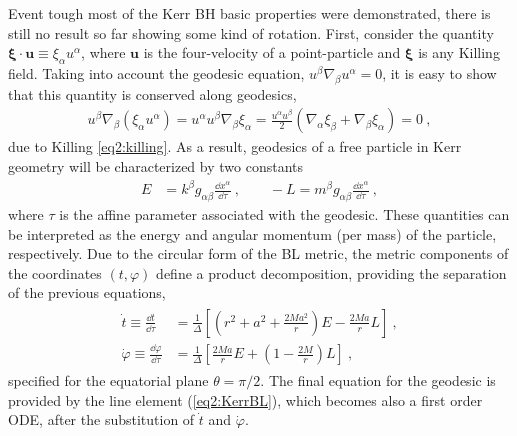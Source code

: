 Event tough most of the Kerr BH basic properties were demonstrated, there is still no result so far showing some kind of rotation.
First, consider the quantity $\bm{\xi}\cdot \bm{u} \equiv \xi_\alpha u^\alpha$, where $\bm{u}$ is the four-velocity of a point-particle and $\bm{\xi}$ is any Killing field. 
Taking into account the geodesic equation, $u^\beta \nabla_\beta u^\alpha = 0$, it is easy to show that this quantity is conserved along geodesics,
\begin{align}
    u^\beta \nabla_\beta ( \xi_\alpha u^\alpha ) = u^\alpha u^\beta \nabla_\beta \xi_\alpha = \frac{u^\alpha u^\beta }{2} \left( \nabla_\alpha \xi_\beta + \nabla_\beta \xi_\alpha \right) = 0 ~,
    \label{eq2:geodesicKilling}
\end{align}
due to Killing \eqref{eq2:killing}.
As a result, geodesics of a free particle in Kerr geometry will be characterized by two constants
\begin{align}
    E &=  k^\beta g_{\alpha\beta} \frac{\dd x^\alpha}{\dd \tau} ~, \qquad -L = m^\beta g_{\alpha\beta} \frac{\dd x^\alpha}{\dd \tau} ~,
    \label{eq2:geodesicConsts}
\end{align}
where $\tau$ is the affine parameter associated with the geodesic.
These quantities can be interpreted as the energy and angular momentum (per mass) of the particle, respectively.
Due to the circular form of the BL metric, the metric components of the coordinates $(t,\varphi)$ define a product decomposition, providing the separation of the previous equations,
\begin{align}
    \label{eq2:geodesicTPhi}
    \begin{split}
        \dot{t} \equiv \frac{\dd t}{\dd \tau} &= \frac{1}{\Delta} \left[ (r^2+a^2 +\frac{2 M a^2}{r})E - \frac{2 M a}{r} L \right] ~,  \\
        \dot{\varphi} \equiv \frac{\dd \varphi}{\dd \tau} &= \frac{1}{\Delta} \left[ \frac{2 M a}{r} E +\left( 1- \frac{2 M}{r} \right) L \right]  ~,
    \end{split}
\end{align}
specified for the equatorial plane $\theta=\pi/2$.
The final equation for the geodesic is provided by the line element (\ref{eq2:KerrBL}), which becomes also a first order ODE, after the substitution of $\dot{t}$ and $\dot{\varphi}$. 

